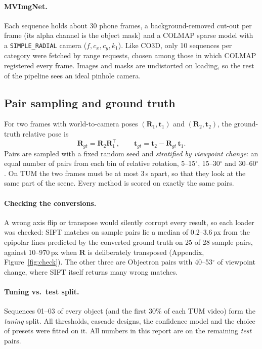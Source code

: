 \documentclass[11pt,a4paper]{article}
\newcommand{\R}{\mathbf{R}}
\newcommand{\tv}{\mathbf{t}}
\begin{document}
\paragraph{MVImgNet.} Each sequence holds about 30 phone frames, a background-removed cut-out
per frame (its alpha channel is the object mask) and a COLMAP sparse model with a
\texttt{SIMPLE\_RADIAL} camera ($f, c_x, c_y, k_1$). Like CO3D, only 10 sequences per category
were fetched by range requests, chosen among those in which COLMAP registered every frame. Images
and masks are undistorted on loading, so the rest of the pipeline sees an ideal pinhole camera.

\subsection{Pair sampling and ground truth}
\label{sec:pairs}

For two frames with world-to-camera poses $(\R_1,\tv_1)$ and $(\R_2,\tv_2)$, the ground-truth
relative pose is
\begin{equation}
  \R_{gt} = \R_2\R_1^\top, \qquad \tv_{gt} = \tv_2 - \R_{gt}\,\tv_1 .
\end{equation}
Pairs are sampled with a fixed random seed and \emph{stratified by viewpoint change}: an equal
number of pairs from each bin of relative rotation, 5--15$^\circ$, 15--30$^\circ$ and
30--60$^\circ$. On TUM the two frames must be at most 3\,s apart, so that they look at the same part
of the scene. Every method is scored on exactly the same pairs.

\paragraph{Checking the conversions.} A wrong axis flip or transpose would silently corrupt every result, so each loader was checked: SIFT matches on sample pairs lie a median of 0.2--3.6\,px from the epipolar lines predicted by the converted ground truth on 25 of 28 sample pairs, against 10--970\,px when $\R$ is deliberately transposed (Appendix, Figure~\ref{fig:check}). The other three are Objectron pairs with 40--53$^\circ$ of viewpoint change, where SIFT itself returns many wrong matches.

\paragraph{Tuning vs.\ test split.} Sequences 01--03 of every object (and the first 30\% of each
TUM video) form the \emph{tuning} split. All thresholds, cascade designs, the confidence model and the
choice of presets were fitted on it. All numbers in this report are on the remaining
\emph{test} pairs.
\end{document}
